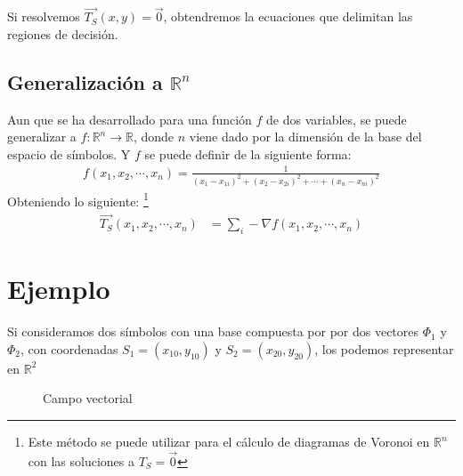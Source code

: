 \documentclass{article}
\begin{document}
Si resolvemos $\vec{T_S}(x,y) = \vec{0}$, obtendremos la ecuaciones que delimitan
las regiones de decisión.

\subsection{Generalización a $\mathbb{R}^n$}
Aun que se ha desarrollado para una función $f$ de dos variables, se puede
generalizar a $f: \mathbb{R}^n \rightarrow \mathbb{R}$, donde $n$ viene dado por la dimensión de la base
del espacio de símbolos. Y $f$ se puede definir de la siguiente forma:
\begin{align}
  \label{eq:generalf}
  f(x_1, x_2, \cdots ,x_n) = \frac{1}{(x_1 - x_{1i})^2 + (x_2 - x_{2i})^2 + \cdots + (x_n - x_{ni})^2}
\end{align}
Obteniendo lo siguiente: \footnote{Este método se puede utilizar para el cálculo
de diagramas de Voronoi en $\mathbb{R}^n$ con las soluciones a $T_S = \vec{0}$}
\begin{align}
  \label{eq:generalF}
  \vec{T_S}(x_1, x_2, \cdots , x_n) &= \sum_i -\nabla f(x_1, x_2, \cdots ,x_n)
\end{align}

\section{Ejemplo}
Si consideramos dos símbolos con una base compuesta por por dos vectores
$\Phi_1$ y $\Phi_2$, con coordenadas $S_1=(x_{10}, y_{10})$ y $S_2=(x_{20}, y_{20})$, los podemos
representar en $\mathbb{R}^2$
\begin{figure}[h!]
  \centering
  
  \caption{Campo vectorial}
  \label{fig:vecfield}
\end{figure}
\end{document}
